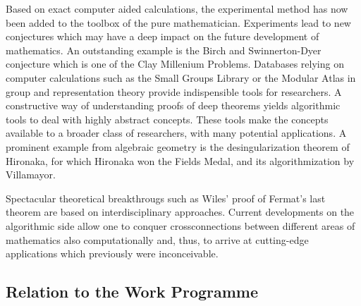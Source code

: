 \documentclass[a4paper,11pt]{article}
\begin{document}
Based on exact computer aided calculations, the experimental method has
now been added to the toolbox of the pure mathematician. Experiments
lead to new conjectures which may have a deep impact on the future
development of mathematics. An outstanding example is the Birch and
Swinnerton-Dyer conjecture which is one of the Clay Millenium Problems.
Databases relying on computer calculations such as the Small Groups
Library or the Modular Atlas in group and representation theory provide
indispensible tools for researchers. A constructive way of understanding
proofs of deep theorems yields algorithmic tools to deal with highly abstract
concepts. These tools make the concepts available to a broader class of
researchers, with many potential applications. A prominent example from
algebraic geometry is the desingularization theorem of Hironaka, for which
Hironaka won the Fields Medal, and its algorithmization by Villamayor.

Spectacular theoretical breakthrougs such as Wiles' proof of Fermat's last
theorem are based on interdisciplinary approaches. Current developments
on the algorithmic side allow one to conquer crossconnections between
different areas of mathematics also computationally and, thus, to
arrive at cutting-edge applications which previously were inconceivable.





\draftpage

\subsection{Relation to the Work Programme}



\eucommentary{
  
}

\draftpage
\end{document}

